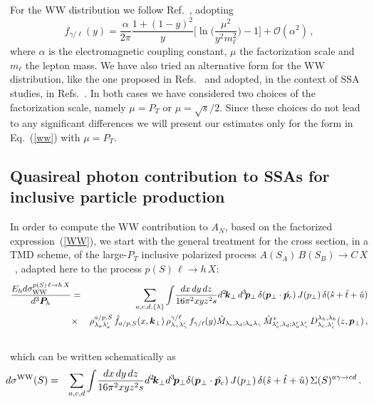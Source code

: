 \documentclass[nofootinbib,superscriptaddress,aps]{revtex4}
\newcommand{\be}{\begin{equation}}
\newcommand{\ee}{\end{equation}}
\newcommand{\bea}{\begin{eqnarray}}
\newcommand{\eea}{\end{eqnarray}}
\begin{document}
For the WW distribution we follow Ref.~\cite{Hinderer:2015hra}, adopting
\be
f_{\gamma/\ell}(y) = \frac{\alpha}{2\pi} \frac{1+(1-y)^2}{y}\Biggl[\ln \Biggl({\frac{\mu^2}{y^2 m^2_{\ell}}}\Biggr) - 1 \Biggr] + \mathcal{O}(\alpha^2)
  \,,
\label{ww}
\ee
where $\alpha$ is the electromagnetic coupling constant, $\mu$ the factorization scale and $m_\ell$ the lepton mass. We have also tried an alternative form for the WW distribution, like the one proposed in Refs.~\cite{Brodsky:1971ud,Terazawa:1973tb,Kniehl:1990iv} and adopted, in the context of SSA studies, in Refs.~\cite{Godbole:2012bx,Godbole:2013bca}. In both cases we have considered two choices of the factorization scale, namely $\mu=P_T$ or $\mu=\sqrt s/2$. Since these choices do not lead to any significant differences we will present our estimates only for the form in Eq.~(\ref{ww}) with $\mu=P_T$.


\subsection{Quasireal photon contribution to SSAs for inclusive particle production}
\label{formWW}

In order to compute the WW contribution to $A_N$, based on the factorized expression~(\ref{WW}), we start with the general treatment for the cross section, in a TMD scheme, of the large-$P_T$ inclusive polarized process $A(S_A) \, B(S_B) \to C \, X$~\cite{Anselmino:2005sh}, adapted here to the process $p(S)\,\ell\to h\, X$:
%
\bea
\label{master}
    \frac{E_hd\sigma^{p(S)\,\ell\to h\, X}_{\rm WW}}{d^3\bm{P}_h}
	    & = & \sum_{a,c,d,\{\lambda\}}\int\!\frac{dx\, dy\, dz}{16\pi^2 x y z^2 s} d^2\!\bm{k}_\perp\,
d^3\!\bm{p}_{\perp}\, \delta(\bm{p}_{\perp}\cdot \hat{\bm{p}_c})\, J(p_\perp)\,\delta(\hat s +\hat t+ \hat u)  \nonumber\\
& \times &  \rho_{\lambda _a\lambda_{a}'}^{a/p,S}\, \hat f_{a/p,S}(x,\bm{k}_{\perp})\,\rho_{\lambda _\gamma\lambda_{\gamma}'}^{\gamma/\ell}\, f_{\gamma/\ell}(y)%
\hat M_{\lambda_c,\lambda_d;\lambda_a\lambda_\gamma}\,\hat M_{\lambda_c',\lambda_d;\lambda_a'\lambda_\gamma'}^* \, D_{\lambda_c,\lambda_c'}^{\lambda_h,\lambda_h}(z,\bm{p}_\perp)\,,\nonumber\\
&&
\eea
which can be written schematically as
\bea
\label{master2}
\!\!\!\!\!\!\!d\sigma^{\rm WW}(S) &=&  \sum_{a,c,d}\int\!\frac{dx\, dy\, dz}{16\pi^2 x y z^2 s} d^2\!\bm{k}_\perp
d^3\!\bm{p}_{\perp} \delta(\bm{p}_{\perp}\cdot \hat{\bm{p}_c})\, J(p_\perp)\,\delta(\hat s +\hat t+ \hat u)
\, \Sigma(S)^{a\gamma\to cd}
\,.
\eea
\end{document}
